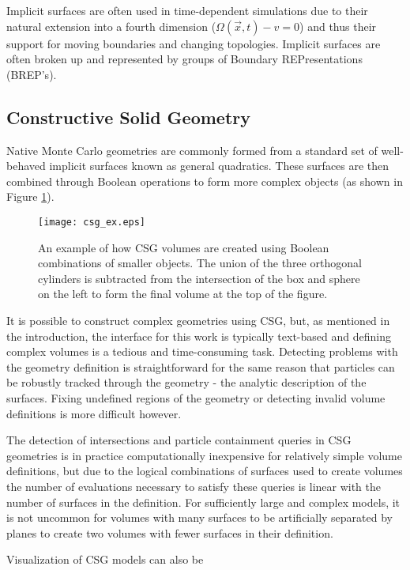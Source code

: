 Implicit surfaces are often used in time-dependent simulations due to their
natural extension into a fourth dimension ($ \Omega(\vec{x},t) - v  = 0 $) and
thus their support for moving boundaries and changing topologies. Implicit
surfaces are often broken up and represented by groups of Boundary
REPresentations (BREP's). 

\subsection{Constructive Solid Geometry}\label{subsec:csg}

Native Monte Carlo geometries are commonly formed from a standard set of
well-behaved implicit surfaces known as general quadratics. These surfaces are
then combined through Boolean operations to form more complex objects (as shown
in Figure \ref{fig:csg_ex}).

\begin{figure}[h]
  \centering
  \texttt{[image: csg\_ex.eps]}
  \caption{An example of how CSG volumes are created using Boolean combinations
    of smaller objects. The union of the three orthogonal cylinders is
    subtracted from the intersection of the box and sphere on the left to form
    the final volume at the top of the figure.}
  \label{fig:csg_ex}
\end{figure}

It is possible to construct complex geometries using CSG, but, as mentioned in
the introduction, the interface for this work is typically text-based and
defining complex volumes is a tedious and time-consuming task. Detecting
problems with the geometry definition is straightforward for the same reason
that particles can be robustly tracked through the geometry - the analytic
description of the surfaces. Fixing undefined regions of the geometry or
detecting invalid volume definitions is more difficult however.

The detection of intersections and particle containment queries in CSG
geometries is in practice computationally inexpensive for relatively simple
volume definitions, but due to the logical combinations of surfaces used to
create volumes the number of evaluations necessary to satisfy these queries is
linear with the number of surfaces in the definition. For sufficiently large and
complex models, it is not uncommon for volumes with many surfaces to be
artificially separated by planes to create two volumes with fewer surfaces in
their definition.

Visualization of CSG models can also be 
